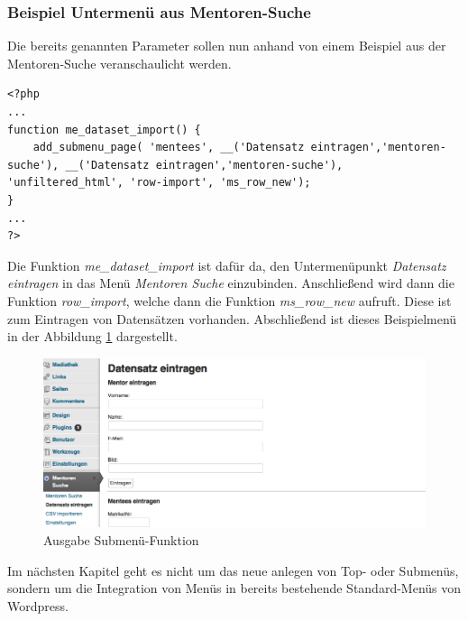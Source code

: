 \subsubsection{Beispiel Untermenü aus Mentoren-Suche}\label{bsperstum}
Die bereits genannten Parameter sollen nun anhand von einem Beispiel aus der Mentoren-Suche veranschaulicht werden. \newline
{}
\begin{lstlisting}
<?php 
...
function me_dataset_import() {
	add_submenu_page( 'mentees', __('Datensatz eintragen','mentoren-suche'), __('Datensatz eintragen','mentoren-suche'), 'unfiltered_html', 'row-import', 'ms_row_new');
}
...
?>
\end{lstlisting}
Die Funktion \emph{me\_dataset\_import} ist dafür da, den Untermenüpunkt \emph{Datensatz eintragen} in das Menü \emph{Mentoren Suche} einzubinden. Anschließend wird dann die Funktion \emph{row\_import}, welche dann die Funktion \emph{ms\_row\_new} aufruft. Diese ist zum Eintragen von Datensätzen vorhanden. Abschließend ist dieses Beispielmenü in der Abbildung \ref{img:aussub} dargestellt.
\newpage
  \begin{figure}[htbp]
	\begin{center}
		\includegraphics[angle={360}, scale=0.4]{pictures/mentsuchergsubmenue.png}
	    \caption{Ausgabe Submenü-Funktion}
	    \label{img:aussub}
	    	\end{center}
   \end{figure}
Im nächsten Kapitel geht es nicht um das neue anlegen von Top- oder Submenüs, sondern um die Integration von Menüs in bereits bestehende Standard-Menüs von Wordpress.
